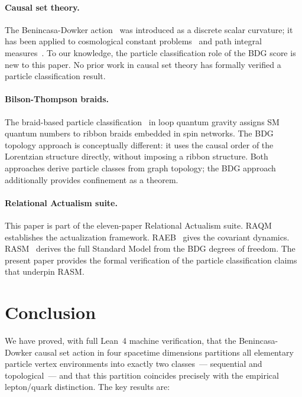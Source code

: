 \documentclass[11pt,a4paper]{article}
\begin{document}
\paragraph{Causal set theory.}
The Benincasa-Dowker action~\citep{Benincasa2010} was introduced as a
discrete scalar curvature; it has been applied to cosmological
constant problems~\citep{Sorkin2005} and path integral
measures~\citep{Dowker2013}. To our knowledge, the particle
classification role of the BDG score is new to this paper.
No prior work in causal set theory has formally verified a particle
classification result.

\paragraph{Bilson-Thompson braids.}
The braid-based particle classification~\citep{BilsonThompson2005}
in loop quantum gravity assigns SM quantum numbers to ribbon braids
embedded in spin networks. The BDG topology approach is conceptually
different: it uses the causal order of the Lorentzian structure directly,
without imposing a ribbon structure. Both approaches derive particle
classes from graph topology; the BDG approach additionally provides
confinement as a theorem.

\paragraph{Relational Actualism suite.}
This paper is part of the eleven-paper Relational Actualism suite.
RAQM~\citep{Sandeman2026RAQM} establishes the actualization framework.
RAEB~\citep{Sandeman2026RAEB} gives the covariant dynamics.
RASM~\citep{Sandeman2026RASM} derives the full Standard Model from the
BDG degrees of freedom. The present paper provides the formal
verification of the particle classification claims that underpin RASM.

\section{Conclusion}
\label{sec:conclusion}

We have proved, with full Lean~4 machine verification, that the
Benincasa-Dowker causal set action in four spacetime dimensions
partitions all elementary particle vertex environments into exactly
two classes~--- sequential and topological~--- and that this partition
coincides precisely with the empirical lepton/quark distinction.
The key results are:
\end{document}
